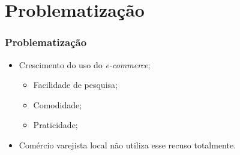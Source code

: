 \section{Problematização}

\begin{frame}
\frametitle{Problematização}
	\begin{itemize}
		\item Crescimento do uso do \textit{e-commerce};
		\begin{itemize}	
			\item Facilidade de pesquisa;
			\item Comodidade;
			\item Praticidade;
		\end{itemize}
		\item Comércio varejista local não utiliza esse recuso totalmente.
	\end{itemize}
\end{frame}
